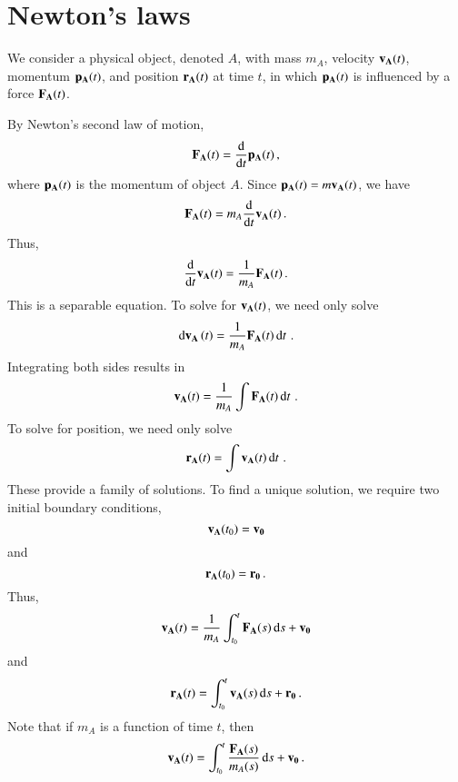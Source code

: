 \documentclass[ ../main.tex]{subfiles}
\begin{document}
\section{Newton's laws}
We consider a physical object, denoted $A$, with mass $m_A$, velocity $\vb{v_A}(t)$, momentum $\vb{p_A}(t)$, and position $\vb{r_A}(t)$ at time $t$, in which $\vb{p_A}(t)$ is influenced by a force $\vb{F_A}(t)$.

By Newton's second law of motion,
\begin{equation}
\vb{F_A}(t) = \dv{t} \vb{p_A}(t)\,,
\end{equation}
where $\vb{p_A}(t)$ is the momentum of object $A$. Since $\vb{p_A}(t) = m \vb{v_A}(t)$, we have
\begin{equation}
\vb{F_A}(t) = m_A \dv{t} \vb{v_A}(t)\,.
\end{equation}
Thus,
\begin{equation}
\dv{t} \vb{v_A}(t) = \frac{1}{m_A} \vb{F_A}(t)\,.
\end{equation}
This is a separable equation. To solve for $\vb{v_A}(t)$, we need only solve
\begin{equation}
\dd{\vb{v_A}}(t) = \frac{1}{m_A} \vb{F_A}(t) \dd{t}\,.
\end{equation}
Integrating both sides results in
\begin{equation}
\vb{v_A}(t) = \frac{1}{m_A} \int \vb{F_A}(t) \dd{t}\,.
\end{equation}
To solve for position, we need only solve
\begin{equation}
\vb{r_A}(t) = \int \vb{v_A}(t) \dd{t}\,.
\end{equation}
These provide a family of solutions. To find a unique solution, we require two initial boundary conditions,
\begin{equation}
\vb{v_A}(t_0) = \vb{v_0}
\end{equation}
and
\begin{equation}
\vb{r_A}(t_0) = \vb{r_0}\,.
\end{equation}
Thus,
\begin{equation}
\vb{v_A}(t) = \frac{1}{m_A} \int_{t_0}^{t} \vb{F_A}(s) \dd{s} + \vb{v_0}
\end{equation}
and
\begin{equation}
\vb{r_A}(t) = \int_{t_0}^{t} \vb{v_A}(s) \dd{s} + \vb{r_0}\,.
\end{equation}
Note that if $m_A$ is a function of time $t$, then
\begin{equation}
\vb{v_A}(t) = \int_{t_0}^{t} \frac{\vb{F_A}(s)}{m_A(s)} \dd{s} + \vb{v_0}\,.
\end{equation}
\end{document}
